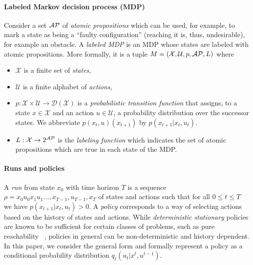 \paragraph*{Labeled Markov decision process (MDP)} Consider a set $\mathcal{AP}$ of \emph{atomic propositions} which can be used, for example, to mark a state as being a ``faulty configuration'' (reaching it is, thus, undesirable), for example an obstacle. A \emph{labeled MDP} is an MDP whose states are labeled with atomic propositions. More formally, it is a tuple $M=(\mathcal{X},\mathcal{U},p,\mathcal{AP},L)$ where 
\begin{itemize}
\item $\mathcal{X}$ is a
	finite set of \emph{states},
\item $\mathcal{U}$ is a finite alphabet of \emph{actions},
\item 	$p: \mathcal{X}\times\mathcal{U} \to \mathcal{D}({\mathcal{X}})$ is a \emph{probabilistic	transition function} that assigns, to a state $x\in \mathcal{X}$ and an action $u \in\mathcal{U}$, a probability distribution over the successor states. We abbreviate $p(x_{t},u)(x_{t+1})$ by $p(x_{t+1}|x_t,u_t)$.
\item $L : \mathcal{X} \rightarrow 2^{\mathcal{AP}}$ is the \emph{labeling function} which indicates the set of atomic propositions which are true in each state of the MDP.
\end{itemize}

\paragraph*{Runs and policies}
A \emph{run} from state $x_0$ with time horizon $T$ is a sequence $\rho = x_0 u_0 x_1 u_1 \dots ,x_{T-1},u_{T-1},x_{T}$ of states and actions such that for all $0 \leq t\leq T$ we have $p(x_{t+1}|x_t,u_t)>0$. 
%
A \emph{policy} corresponds to a way of selecting actions based on the history
of states and actions. While \emph{deterministic stationary} policies
are known to be sufficient for certain classes of problems, such as pure reachability ~\cite{puterman2014}, policies in general can be non-deterministic and history dependent. In this paper, we consider the general form and formally represent a policy as a conditional probability distribution $q_t(u_t|x^t,u^{t-1})$. 

